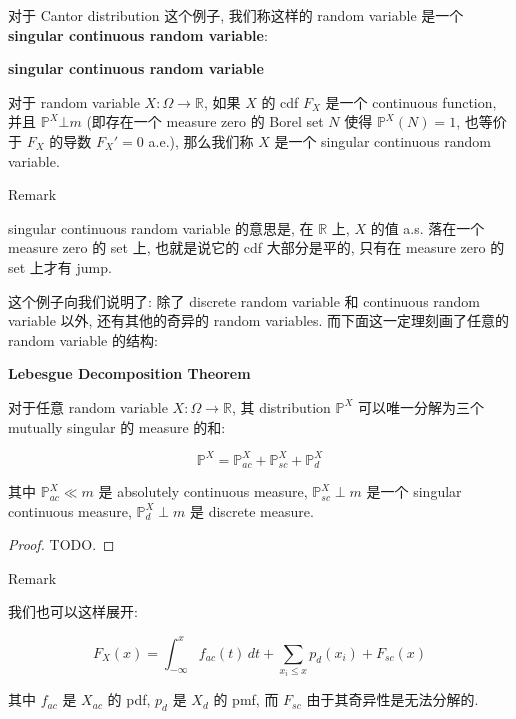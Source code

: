 \documentclass{qlnotes-export}
\begin{document}
对于 Cantor distribution 这个例子, 我们称这样的 random variable 是一个 \textbf{singular continuous random variable}:

\begin{definition}{\protect{}\label{kn-singular-continuous-random-variable}{\textbf{singular
continuous random variable}}}

对于 random variable \(X:\Omega\rightarrow{\mathbb{R}}\), 如果 \(X\) 的 cdf \(F_{X}\) 是一个 continuous function, 并且 \({\mathbb{P}}^{X}\bot m\) (即存在一个 measure zero 的 Borel set \(N\) 使得 \({\mathbb{P}}^{X}(N) = 1\), 也等价于 \(F_{X}\) 的导数 \(F_{X}' = 0\) a.e.), 那么我们称 \(X\) 是一个 singular continuous random variable.

\end{definition}

\begin{qlremark}{Remark}

singular continuous random variable 的意思是, 在 \(\mathbb{R}\) 上, \(X\) 的值 a.s. 落在一个 measure zero 的 set 上, 也就是说它的 cdf 大部分是平的, 只有在 measure zero 的 set 上才有 jump.

\end{qlremark}

这个例子向我们说明了: 除了 discrete random variable 和 continuous random variable 以外, 还有其他的奇异的 random variables. 而下面这一定理刻画了任意的 random variable 的结构:

\begin{theorem}{\protect{}\label{kn-lebesgue-decomposition-theorem}{\textbf{Lebesgue
Decomposition Theorem}}}

对于任意 random variable \(X:\Omega\rightarrow{\mathbb{R}}\), 其 distribution \({\mathbb{P}}^{X}\) 可以唯一分解为三个 mutually singular 的 measure 的和:

\[{\mathbb{P}}^{X} = {\mathbb{P}}_{ac}^{X} + {\mathbb{P}}_{sc}^{X} + {\mathbb{P}}_{d}^{X}\]

其中 \({\mathbb{P}}_{ac}^{X} \ll m\) 是 absolutely continuous measure, \({\mathbb{P}}_{sc}^{X} \perp m\) 是一个 singular continuous measure, \({\mathbb{P}}_{d}^{X} \perp m\) 是 discrete measure.

\end{theorem}

\begin{proof}

TODO.

\end{proof}

\begin{qlremark}{Remark}

我们也可以这样展开:

\[F_{X}(x) = \int_{- \infty}^{x}f_{ac}(t)\, dt + \sum\limits_{x_{i} \leq x}p_{d}(x_{i}) + F_{sc}(x)\]

其中 \(f_{ac}\) 是 \(X_{ac}\) 的 pdf, \(p_{d}\) 是 \(X_{d}\) 的 pmf, 而 \(F_{sc}\) 由于其奇异性是无法分解的.

\end{qlremark}
\end{document}
